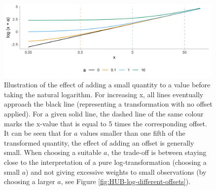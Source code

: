 \documentclass{article}
\begin{document}
\begin{figure}[h!]
    \centering
    \includegraphics[width=0.99\textwidth]{output/figures/illustration-effect-offset-log.png}
    \caption{Illustration of the effect of adding a small quantity to a value before taking the natural logarithm. For increasing x, all lines eventually approach the black line (representing a transformation with no offset applied).
    For a given solid line, the dashed line of the same colour marks the x-value that  is equal to 5 times the corresponding offset. It can be seen that for $a$ values smaller than one fifth of the transformed quantity, the effect of adding an offset is generally small. When choosing a suitable $a$, the trade-off is between staying close to the interpretation of a pure log-transformation (choosing a small $a$) and not giving excessive weights to small observations (by choosing a larger $a$, see Figure \ref{fig:HUB-log-different-offsets}).}
    \label{fig:illustration-effect-log-offset}
\end{figure}
\end{document}
